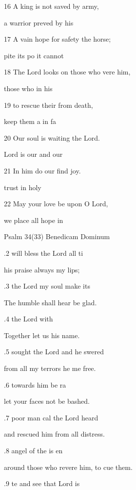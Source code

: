 16 A king is not saved by  army, 

 a warrior preved by his  

17 A vain hope for safety  the horse; 

pite its po it cannot  

18 The Lord looks on those who vere him, 

 those who  in his  

19 to rescue their  from death, 

 keep them a in fa 

20 Our soul is waiting  the Lord. 

 Lord is our  and our  

21 In him do our  find joy. 

 trust in  holy  

22 May your love be upon  O Lord, 

 we place all  hope in  

Psalm 34(33) Benedicam Dominum 


.2  will bless the Lord  all ti 

his praise always  my lips; 

.3  the Lord my soul  make its  

The humble shall hear  be glad. 

.4  the Lord with  

Together let us  his name. 

.5  sought the Lord and he swered  

from all my terrors he  me free. 

.6  towards him  be ra 

let your faces not be bashed. 

.7  poor man cal the Lord heard  

and rescued him from all  distress. 

.8  angel of the  is en 

around those who revere him, to cue them. 

.9 te and see that  Lord is  

